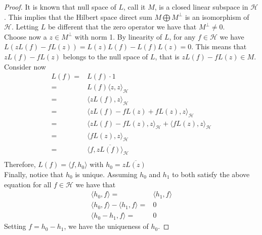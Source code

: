 \begin{proof}
    It is known that null space of $L$, call it $M$, is a closed linear subspace in $\mathcal{H}$. This implies that the Hilbert space direct sum $M \bigoplus M^\bot$ is an isomorphism of $\mathcal{H}$. Letting $L$ be different that the zero operator we have that $M^\bot \neq {0}$.
    \\
    Choose now a $z \in M^\bot$ with norm 1. By linearity of $L$, for any $f \in \mathcal{H}$ we have $L(zL(f)- fL(z))=L(z)L(f)- L(f)L(z)=0$. This means that $zL(f)- fL(z)$ belongs to the null space of $L$, that is  $zL(f)- fL(z) \in M$. 
    \\
    Consider now 
    \begin{align}
        L(f)=& L(f) \cdot 1
        \\
        =& L(f) \langle z,z\rangle_{\mathcal{H}}
        \\
        =& \langle zL(f), z\rangle_{\mathcal{H}} \\
        =& \langle zL(f) -fL(z)+fL(z), z\rangle_\mathcal{H}
        \\
        =& \langle zL(f) -fL(z), z\rangle_{\mathcal{H}}+\langle fL(z), z\rangle_{\mathcal{H}} \\
        =& \langle fL(z), z\rangle_{\mathcal{H}} \\
        =& \langle f, z\overline{L(f)}\rangle_{\mathcal{H}} \\
    \end{align}
    Therefore, $L(f)=\langle f, h_0\rangle$  with  $h_0=z\overline{L(z)}$
    \\
    Finally, notice that $h_0$ is unique.
    Assuming $h_0$ and $h_1$ to both satisfy the above equation for all $f \in \mathcal{H}$ we have that
    \begin{align}
        \langle h_0,f \rangle=&\langle h_1, f \rangle \\
        \langle h_0,f \rangle-\langle h_1, f \rangle=& 0 \\
        \langle h_0 -h_1,f \rangle=& 0
    \end{align}
    Setting $f=h_0 -h_1$, we have the uniqueness of $h_0$.
    
\end{proof}


